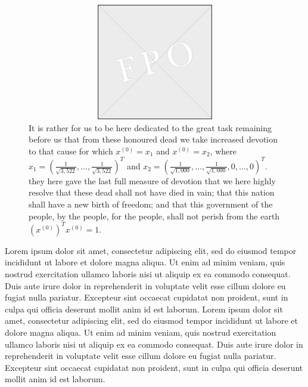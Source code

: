 \documentclass{sbc2025}%
\begin{document}
\begin{figure}
\begin{center}
\includegraphics[width=30pc, height=12pc]{fpo.eps}
\caption{It is rather for us to be here dedicated to the great task remaining before us  that from these honoured dead we take increased devotion to that cause for which $x^{(0)}=x_1$ and $x^{(0)}=x_2$, where $x_1=(\frac{1}{\sqrt{3,522}},\dots,\frac{1}{\sqrt{3,522}})^T$ and $x_2=(\frac{1}{\sqrt{1,000}}, \dots, \frac{1}{\sqrt{1,000}},0,\dots,0)^T $. they here gave the last full measure of devotion  that we here highly resolve that these dead shall not have died in vain; that this nation shall have a new birth of freedom; and that this government of the people, by the people, for the people, shall not perish from the earth $(x^{(0)})^Tx^{(0)}=1$.}
 \label{Fig2}
\end{center}
\end{figure}

Lorem ipsum dolor sit amet, consectetur adipiscing elit, sed do eiusmod tempor incididunt ut labore et dolore magna aliqua. Ut enim ad minim veniam, quis nostrud exercitation ullamco laboris nisi ut aliquip ex ea commodo consequat. Duis aute irure dolor in reprehenderit in voluptate velit esse cillum dolore eu fugiat nulla pariatur. Excepteur sint occaecat cupidatat non proident, sunt in culpa qui officia deserunt mollit anim id est laborum. Lorem ipsum dolor sit amet, consectetur adipiscing elit, sed do eiusmod tempor incididunt ut labore et dolore magna aliqua. Ut enim ad minim veniam, quis nostrud exercitation ullamco laboris nisi ut aliquip ex ea commodo consequat. Duis aute irure dolor in reprehenderit in voluptate velit esse cillum dolore eu fugiat nulla pariatur. Excepteur sint occaecat cupidatat non proident, sunt in culpa qui officia deserunt mollit anim id est laborum.
\end{document}
